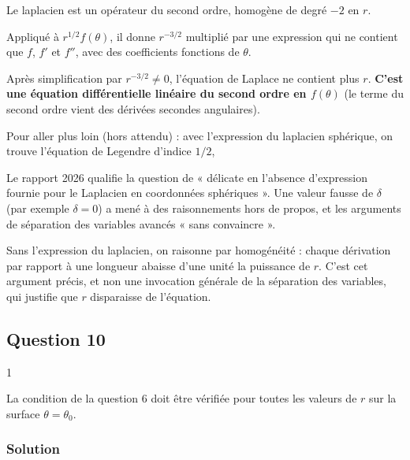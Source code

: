 \documentclass[11pt,a4paper]{article}
\newcommand{\equationajustee}[1]{%
  \sbox{\boiteequation}{$\displaystyle #1$}%
  \ifdim\wd\boiteequation>\linewidth
    \[\resizebox{\linewidth}{!}{\usebox{\boiteequation}}\]%
  \else
    \[#1\]%
  \fi}
\begin{document}
Le laplacien est un opérateur du second ordre, homogène de degré \(-2\) en \(r\).

Appliqué à \(r^{1/2}f(\theta)\), il donne \(r^{-3/2}\) multiplié par une expression qui ne contient que \(f\), \(f'\) et \(f''\), avec des coefficients fonctions de \(\theta\).

Après simplification par \(r^{-3/2}\neq0\), l'équation de Laplace ne contient plus \(r\). \textbf{C'est une équation différentielle linéaire du second ordre en \(f(\theta)\)} (le terme du second ordre vient des dérivées secondes angulaires).

Pour aller plus loin (hors attendu) : avec l'expression du laplacien sphérique, on trouve l'équation de Legendre d'indice \(1/2\),

\equationajustee{\frac{1}{\sin\theta}(\sin\theta f')'+\frac34f=0 .}

\begin{jury}

Le rapport 2026 qualifie la question de « délicate en l'absence d'expression fournie pour le Laplacien en coordonnées sphériques ». Une valeur fausse de \(\delta\) (par exemple \(\delta=0\)) a mené à des raisonnements hors de propos, et les arguments de séparation des variables avancés « sans convaincre ».

\end{jury}

\begin{methode}

Sans l'expression du laplacien, on raisonne par homogénéité : chaque dérivation par rapport à une longueur abaisse d'une unité la puissance de \(r\). C'est cet argument précis, et non une invocation générale de la séparation des variables, qui justifie que \(r\) disparaisse de l'équation.

\end{methode}

\hypertarget{question-10}{%
\subsection{Question 10}\label{question-10}}

\begin{indication}{1}

La condition de la question 6 doit être vérifiée pour toutes les valeurs de \(r\) sur la surface \(\theta=\theta_0\).

\end{indication}

\hypertarget{solution-9}{%
\subsubsection{Solution}\label{solution-9}}
\end{document}

